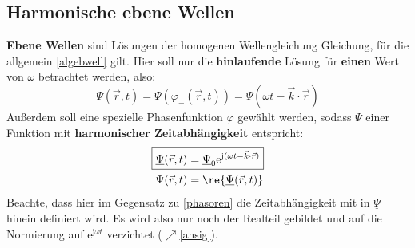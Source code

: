  \subsection{Harmonische ebene Wellen}\label{harmebwell}
  		 \textbf{Ebene Wellen} sind Lösungen der homogenen Wellengleichung Gleichung, für die allgemein \ref{algebwell} gilt. Hier soll nur die \textbf{hinlaufende} Lösung für \textbf{einen} Wert von \(\omega\) betrachtet werden, also:
		        \begin{equation}
			        \Psi(\vec{r} , t) = \Psi(\varphi_-(\vec{r} , t)) = \Psi(\omega t - \vec{k}\cdot\vec{r} )
		        \end{equation}
		   Außerdem soll eine spezielle Phasenfunktion \(\varphi\) gewählt werden, sodass \(\Psi\) einer Funktion mit \textbf{harmonischer Zeitabhängigkeit} entspricht:
		        \begin{equation}\begin{split}
			        \Aboxed{\underline{\Psi}(\vec{r} , t) &= \underline{\Psi}_0  \mathrm{e}^{\mathrm{j}(\omega t -\vec{k} \cdot \vec{r} )} }  \\ \Psi(\vec{r} , t) &= \re{\underline{\Psi}(\vec{r} , t)}
		        \end{split}\end{equation}
	     Beachte, dass hier im Gegensatz zu \ref{phasoren} die Zeitabhängigkeit mit in $\underline{\Psi}$ hinein definiert wird. Es wird also nur noch der Realteil gebildet und auf die Normierung auf $\mathrm{e}^{\mathrm{j}\omega t}$ verzichtet ($\nearrow$\ref{ansig}).
